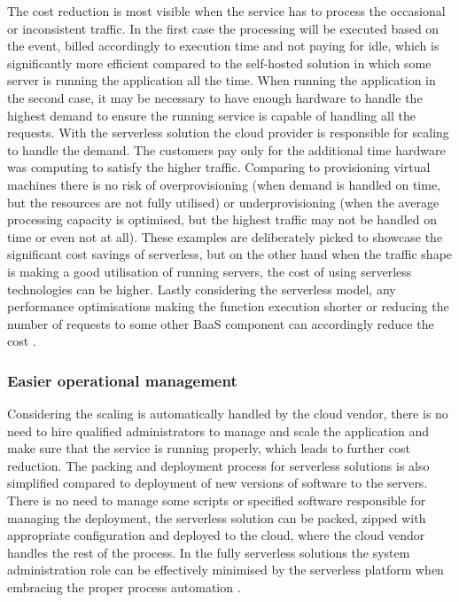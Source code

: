 The cost reduction is most visible when the service has to process the occasional or inconsistent traffic. In the first case the processing will be executed based on the event, billed accordingly to execution time and not paying for idle, which is significantly more efficient compared to the self-hosted solution in which some server is running the application all the time. When running the application in the second case, it may be necessary to have enough hardware to handle the highest demand to ensure the running service is capable of handling all the requests. With the serverless solution the cloud provider is responsible for scaling to handle the demand. The customers pay only for the additional time hardware was computing to satisfy the higher traffic. Comparing to provisioning virtual machines there is no risk of overprovisioning (when demand is handled on time, but the resources are not fully utilised) or underprovisioning (when the average processing capacity is optimised, but the highest traffic may not be handled on time or even not at all). These examples are deliberately picked to showcase the significant cost savings of serverless, but on the other hand when the traffic shape is making a good utilisation of running servers, the cost of using serverless technologies can be higher. Lastly considering the serverless model, any performance optimisations making the function execution shorter or reducing the number of requests to some other BaaS component can accordingly reduce the cost \cite{MartinFowlerServerless}.

\subsubsection*{Easier operational management}

Considering the scaling is automatically handled by the cloud vendor, there is no need to hire qualified administrators to manage and scale the application and make sure that the service is running properly, which leads to further cost reduction. The packing and deployment process for serverless solutions is also simplified compared to deployment of new versions of software to the servers. There is no need to manage some scripts or specified software responsible for managing the deployment, the serverless solution can be packed, zipped with appropriate configuration and deployed to the cloud, where the cloud vendor handles the rest of the process. In the fully serverless solutions the system administration role can be effectively minimised by the serverless platform when embracing the proper process automation \cite{MartinFowlerServerless}.

